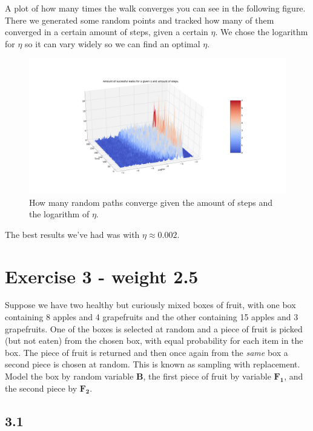 \documentclass[a4paper]{article}
\begin{document}
A plot of how many times the walk converges you can see in the following figure. There we generated some random points and tracked how many of them converged in a certain amount of steps, given a certain $\eta$.
We chose the logarithm for $\eta$ so it can vary widely so we can find an optimal $\eta$.

\begin{figure}[H]
\center
\hspace*{-2cm}
\includegraphics[width=1.25\textwidth]{Images/3dError.png}
\caption{How many random paths converge given the amount of steps and the logarithm of $\eta$.}
\end{figure}

The best results we've had was with  $\eta \approx 0.002$.


\section*{Exercise 3 - weight 2.5}


Suppose we have two healthy but curiously mixed boxes of fruit, with one box containing 8 apples and 4 grapefruits and the other containing 15 apples and 3 grapefruits. One of the boxes is selected at random and a piece of fruit is picked (but not eaten) from the chosen box, with equal probability for each item in the box. The piece of fruit is returned and then once again from the \textit{same} box a second piece is chosen at random. This is known as sampling with replacement. Model the box by random variable $\boldsymbol{B}$, the first piece of fruit by variable $\boldsymbol{F_1}$, and the second piece by $\boldsymbol{F_2}$.


\subsection*{3.1}
\end{document}
